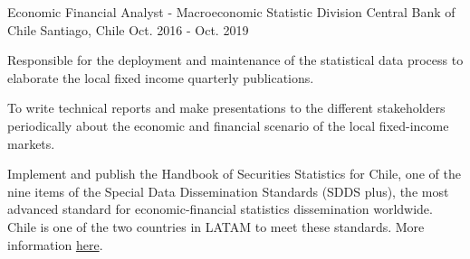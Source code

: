 \begin{cventries}
  \cventry
    {Economic Financial Analyst - Macroeconomic Statistic Division} %
    {Central Bank of Chile} %
    {Santiago, Chile} %
    {Oct. 2016 - Oct. 2019} %
    {
      \begin{cvitems} %
        \item {Responsible for the deployment and maintenance of the statistical data process to elaborate the local fixed income quarterly publications.}
        \item {To write technical reports and make presentations to the different stakeholders periodically about the economic and financial scenario of the local fixed-income markets.}
        \item {Implement and publish the Handbook of Securities Statistics for Chile, one of the nine items of the Special Data Dissemination Standards (SDDS plus), the most advanced standard for economic-financial statistics dissemination worldwide. Chile is one of the two countries in LATAM to meet these standards. More information \href{https://www.bcentral.cl/en/detail-news-and-publications/-/asset_publisher/Exzd7l9NC3Y6/content/id/2228947}{here}.}
      \end{cvitems}
    }

\end{cventries}
